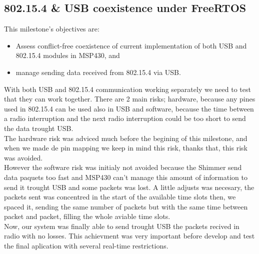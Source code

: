 		\subsection{802.15.4 \& USB coexistence under FreeRTOS}
		\label{ssec:802.15.4.USB.FreeRTOS}	
		This milestone's objectives are:
		\begin{itemize}
		\item Assess conflict-free coexistence of current implementation of both USB and 802.15.4 modules in MSP430, and
		\item manage sending data received from 802.15.4 via USB.
		\end{itemize}
		With both USB and 802.15.4 communication working separately we need to test that they can work together. There are 2 main risks; hardware, because any pines used in 802.15.4 can be used also in USB and software, because the time between a radio interruption and the next radio interruption could be too short to send the data trought USB.\\

		The hardware risk was adviced much before the begining of this milestone, and when we made de pin mapping we keep in mind this risk, thanks that, this risk was avoided.\\

		However the software risk was initialy not avoided because the Shimmer send data paquets too fast and MSP430 can't manage this amount of information to send it trought USB and some packets was lost. A little adjusts was necesary, the packets sent was concentred in the start of the available time slots then, we spaced it, sending the same number of packets but with the same time between packet and packet, filling the whole aviable time slots. \\

		Now, our system was finally able to send trought USB the packets recived in radio with no losses. This achievment was very important before develop and test the final aplication with several real-time restrictions.\\

